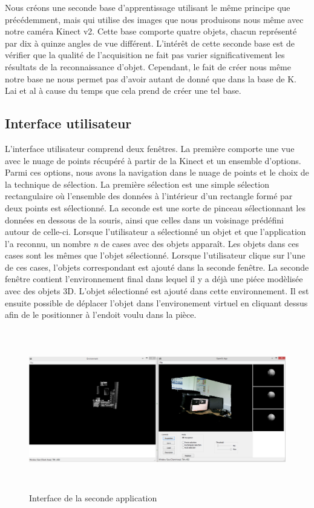 Nous créons une seconde base d'apprentissage utilisant le même principe que précédemment, mais qui utilise des images que nous 
produisons nous même avec notre caméra Kinect v2. Cette base comporte quatre objets, chacun représenté par dix à quinze angles de vue différent.
L'intérêt de cette seconde base est de vérifier que la qualité de l'acquisition ne fait pas varier significativement les résultats de
la reconnaissance d'objet. Cependant, le fait de créer nous même notre base ne nous permet pas d'avoir autant de donné que dans la base de 
K. Lai et al\cite{Base1} à cause du temps que cela prend de créer une tel base.

\subsection{Interface utilisateur}
L'interface utilisateur comprend deux fenêtres. La première comporte une vue avec le nuage de points récupéré à partir de la Kinect
et un ensemble d'options. Parmi ces options, nous avons la navigation dans le nuage de points et le choix de la technique de 
sélection. La première sélection est une simple sélection rectangulaire où l'ensemble des données à l'intérieur d'un rectangle formé
par deux points est sélectionné. La seconde est une sorte de pinceau sélectionnant les données en dessous de la souris, ainsi que celles dans 
un voisinage prédéfini autour de celle-ci. Lorsque l'utilisateur a sélectionné un objet et que l'application l'a reconnu, un nombre \textit{n} de cases 
avec des objets apparaît. Les objets dans ces cases sont les mêmes que l'objet sélectionné. Lorsque l'utilisateur clique sur l'une 
de ces cases, l'objets correspondant est ajouté dans la seconde fenêtre.
La seconde fenêtre contient l'environnement final dans lequel il y a déjà une piéce modèlisée avec des objets 3D. L'objet sélectionné est ajouté dans cette environnement. Il est ensuite possible de déplacer l'objet dans l'environement virtuel en
cliquant dessus afin de le positionner à l'endoit voulu dans la pièce.

\begin{figure}[!h]
  \begin{center}
    \includegraphics[height=7cm]{image/appliObjet.PNG}
    \caption{Interface de la seconde application}
  \end{center}
\end{figure}

